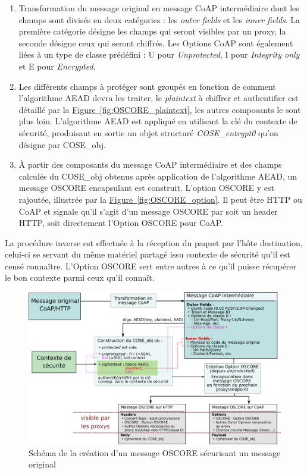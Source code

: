 \documentclass[]{report}
\newcommand{\wordlink}[2]{\hyperref[#2]{#1~\ref{#2}}}
\begin{document}
\vspace{0.1cm}
\begin{enumerate}
\item Transformation du message original en message CoAP intermédiaire dont les champs sont divisés en deux catégories : les \textit{outer fields} et les \textit{inner fields}. La première catégorie désigne les champs qui seront visibles par un proxy, la seconde désigne ceux qui seront chiffrés. Les Options CoAP sont également liées à un type de classe prédéfini : U pour \textit{Unprotected}, I pour \textit{Integrity only} et E pour \textit{Encrypted}.
\vspace{0.2cm}
\item Les différents champs à protéger sont groupés en fonction de comment l'algorithme AEAD devra les traiter, le \textit{plaintext} à chiffrer et authentifier est détaillé par la \wordlink{Figure}{fig:OSCORE_plaintext}, les autres composants le sont plus loin. L'algorithme AEAD est appliqué en utilisant la clé du contexte de sécurité, produisant en sortie un objet structuré \textit{COSE\_entrypt0} qu'on désigne par COSE\_obj.
\vspace{0.2cm}
\item À partir des composants du message CoAP intermédiaire et des champs calculés du COSE\_obj obtenus après application de l'algorithme AEAD, un message OSCORE encapsulant est construit. L'option OSCORE y est rajoutée, illustrée par la \wordlink{Figure}{fig:OSCORE_option}. Il peut être HTTP ou CoAP et signale qu'il s'agit d'un message OSCORE par soit un header HTTP, soit directement l'Option OSCORE pour CoAP.
\end{enumerate}

\vspace{0.2cm}

La procédure inverse est effectuée à la réception du paquet par l'hôte destination, celui-ci se servant du même matériel partagé issu contexte de sécurité qu'il est censé connaître. L'Option OSCORE sert entre autres à ce qu'il puisse récupérer le bon contexte parmi ceux qu'il connaît.

\vspace{0.5cm}

	\begin{figure}[!hb]
	\centering
	\includegraphics[width=0.75\linewidth]{OSCORE_scheme}
	\caption{Schéma de la création d'un message OSCORE sécurisant un message original}
	\label{fig:OSCORE_scheme}
	\end{figure}
	
\end{document}
